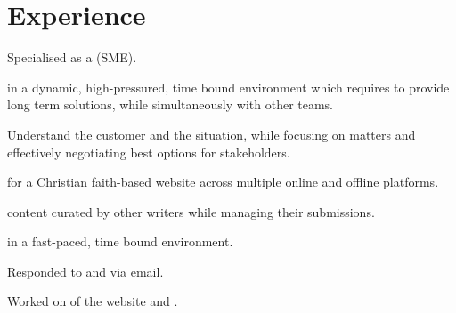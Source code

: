 \documentclass[]{aj-resume-openfont}
\begin{document}
\hfill
\begin{minipage}[t]{0.66\textwidth} 


\section{Experience}

\vspace{\topsep} %
\begin{tightemize}
\item Specialised as a  (SME).
\item {} in a dynamic, high-pressured, time bound environment which requires  to provide long term solutions, while simultaneously  with other teams.
\item Understand the customer and the situation, while focusing on  matters and effectively negotiating best options for stakeholders.
\end{tightemize}
\sectionsep

\begin{tightemize}
\item {} for a Christian faith-based website across multiple online and offline platforms.
\item {} content curated by other writers while managing their submissions.
\end{tightemize}
\sectionsep

\begin{tightemize}
\item {} in a fast-paced, time bound environment.
\item Responded to  and  via email. 
\item Worked on of the website and .
\end{tightemize}
\sectionsep


\end{minipage}
\end{document}
